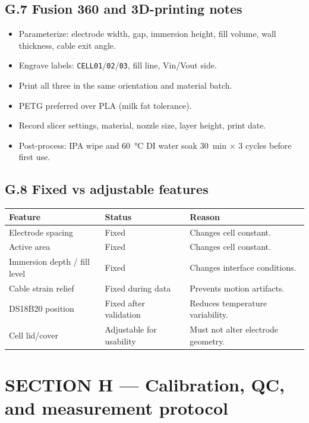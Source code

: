 \documentclass[11pt,a4paper]{article}
\begin{document}
\subsection{G.7 Fusion 360 and 3D-printing notes}

\begin{itemize}
\item Parameterize: electrode width, gap, immersion height, fill volume, wall thickness, cable exit angle.
\item Engrave labels: \texttt{CELL01}/\texttt{02}/\texttt{03}, fill line, Vin/Vout side.
\item Print all three in the same orientation and material batch.
\item PETG preferred over PLA (milk fat tolerance).
\item Record slicer settings, material, nozzle size, layer height, print date.
\item Post-process: IPA wipe and \SI{60}{\celsius} DI water soak 30~min $\times$ 3 cycles before first use.
\end{itemize}

\subsection{G.8 Fixed vs adjustable features}

\begin{xltabular}{\textwidth}{L{35mm}L{35mm}Y}
\toprule
\textbf{Feature} & \textbf{Status} & \textbf{Reason}\\
\midrule
Electrode spacing & Fixed & Changes cell constant.\\
Active area & Fixed & Changes cell constant.\\
Immersion depth / fill level & Fixed & Changes interface conditions.\\
Cable strain relief & Fixed during data & Prevents motion artifacts.\\
DS18B20 position & Fixed after validation & Reduces temperature variability.\\
Cell lid/cover & Adjustable for usability & Must not alter electrode geometry.\\
\bottomrule
\end{xltabular}

\section{SECTION H --- Calibration, QC, and measurement protocol}
\label{sec:H}
\end{document}
